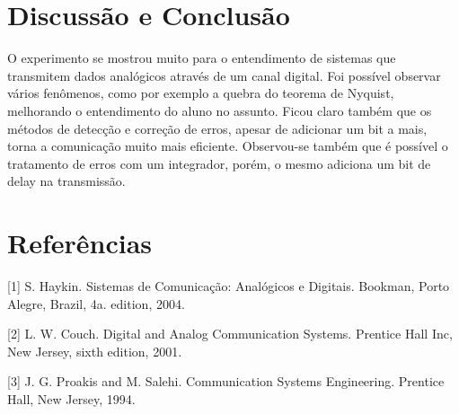 \newpage
\section{Discussão e Conclusão}
O experimento se mostrou muito para o entendimento de sistemas que transmitem dados analógicos através de um canal digital.
Foi possível observar vários fenômenos, como por exemplo a quebra do teorema de Nyquist, melhorando o entendimento do aluno no assunto.
Ficou claro também que os métodos de detecção e correção de erros, apesar de adicionar um bit a mais, torna a comunicação muito mais eficiente.
Observou-se também que é possível o tratamento de erros com um integrador, porém, o mesmo adiciona um bit de delay na transmissão.

\newpage
\section{Referências}
[1] S. Haykin. Sistemas de Comunicação: Analógicos e Digitais. Bookman, Porto Alegre, Brazil,
4a. edition, 2004.


[2] L. W. Couch. Digital and Analog Communication Systems. Prentice Hall Inc, New Jersey,
sixth edition, 2001.


[3] J. G. Proakis and M. Salehi. Communication Systems Engineering. Prentice Hall, New Jersey,
1994.